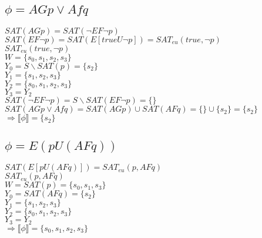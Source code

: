\documentclass[a4paper,10pt]{article}
\begin{document}
\subsection*{$\phi = AGp \vee Afq$}
\hspace*{5mm}$SAT(AGp) = SAT(\neg EF \neg p)$ 
\\[0.25cm] 
\hspace*{5mm}$SAT(EF \neg p) = SAT(E[trueU \neg p]) = SAT_{eu}(true, \neg p)$ 
\\[0.25cm] 
\hspace*{5mm}$SAT_{eu}(true, \neg p)$ 
\\[0.25cm] 
\hspace*{10mm}$W = \{s_0,s_1,s_2,s_3\}$
\\[0.25cm] 
\hspace*{10mm}$Y_0 = S \backslash SAT(p) = \{s_2\}$
\\[0.25cm] 
\hspace*{10mm}$Y_1 = \{s_1,s_2,s_3\}$
\\[0.25cm] 
\hspace*{10mm}$Y_2 = \{s_0,s_1,s_2,s_3\}$
\\[0.25cm] 
\hspace*{10mm}$Y_3 = Y_2$
\\[0.25cm] 
\hspace*{5mm}$SAT(\neg EF \neg p) = S \backslash SAT( EF \neg p) = \{\}$ 
\\[0.25cm] 
\hspace*{5mm}$SAT(AGp \vee Afq) = SAT(AGp) \cup SAT(AFq) = \{\} \cup \{s_2\} = \{s_2\}$
\\[0.25cm] 
\hspace*{5mm} $\Rightarrow \llbracket \phi \rrbracket = \{s_2\}$

\subsection*{$\phi = E(pU(AFq))$}
\hspace*{5mm}$SAT(E[pU(AFq)]) = SAT_{eu}(p,AFq)$ 
\\[0.25cm] 
\hspace*{5mm}$SAT_{eu}(p,AFq)$ 
\\[0.25cm] 
\hspace*{10mm}$W = SAT(p) = \{s_0,s_1,s_3\}$
\\[0.25cm] 
\hspace*{10mm}$Y_0 = SAT(AFq) = \{s_2\}$
\\[0.25cm] 
\hspace*{10mm}$Y_1 = \{s_1,s_2,s_3\}$
\\[0.25cm] 
\hspace*{10mm}$Y_2 = \{s_0,s_1,s_2,s_3\}$
\\[0.25cm] 
\hspace*{10mm}$Y_3 = Y_2$
\\[0.25cm] 
\hspace*{5mm} $\Rightarrow \llbracket \phi \rrbracket = \{s_0,s_1,s_2,s_3\}$
\end{document}
